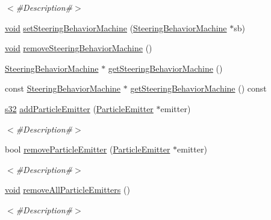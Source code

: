 \begin{DoxyCompactItemize}
\begin{DoxyCompactList}\small\item\em $<$\#\+Description\#$>$ \end{DoxyCompactList}\item 
\mbox{\hyperlink{_thread_8h_af1e856da2e658414cb2456cb6f7ebc66}{void}} \mbox{\hyperlink{classnjli_1_1_node_a9fda14474ce8a4805e4336a1e1c57dba}{set\+Steering\+Behavior\+Machine}} (\mbox{\hyperlink{classnjli_1_1_steering_behavior_machine}{Steering\+Behavior\+Machine}} $\ast$sb)
\item 
\mbox{\hyperlink{_thread_8h_af1e856da2e658414cb2456cb6f7ebc66}{void}} \mbox{\hyperlink{classnjli_1_1_node_a4a910c860697e885b2e1d98ea4a71acd}{remove\+Steering\+Behavior\+Machine}} ()
\item 
\mbox{\hyperlink{classnjli_1_1_steering_behavior_machine}{Steering\+Behavior\+Machine}} $\ast$ \mbox{\hyperlink{classnjli_1_1_node_a4a6691a03731d68bc8b0c0085f219148}{get\+Steering\+Behavior\+Machine}} ()
\item 
const \mbox{\hyperlink{classnjli_1_1_steering_behavior_machine}{Steering\+Behavior\+Machine}} $\ast$ \mbox{\hyperlink{classnjli_1_1_node_ab12edddc98044af4268387ee63ba66d9}{get\+Steering\+Behavior\+Machine}} () const
\item 
\mbox{\hyperlink{_util_8h_aa62c75d314a0d1f37f79c4b73b2292e2}{s32}} \mbox{\hyperlink{classnjli_1_1_node_ac61c06f12dc9129c1c575515343c9a5c}{add\+Particle\+Emitter}} (\mbox{\hyperlink{classnjli_1_1_particle_emitter}{Particle\+Emitter}} $\ast$emitter)
\begin{DoxyCompactList}\small\item\em $<$\#\+Description\#$>$ \end{DoxyCompactList}\item 
bool \mbox{\hyperlink{classnjli_1_1_node_ae08c22d2d4b832972e97072b4b7ae140}{remove\+Particle\+Emitter}} (\mbox{\hyperlink{classnjli_1_1_particle_emitter}{Particle\+Emitter}} $\ast$emitter)
\begin{DoxyCompactList}\small\item\em $<$\#\+Description\#$>$ \end{DoxyCompactList}\item 
\mbox{\hyperlink{_thread_8h_af1e856da2e658414cb2456cb6f7ebc66}{void}} \mbox{\hyperlink{classnjli_1_1_node_a444e78b0de3fa1072ac008331ec18457}{remove\+All\+Particle\+Emitters}} ()
\begin{DoxyCompactList}\small\item\em $<$\#\+Description\#$>$ \end{DoxyCompactList}\item 

\end{DoxyCompactItemize}
